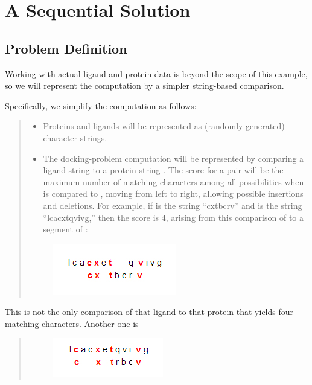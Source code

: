 \documentclass[letterpaper,10pt,openany,oneside]{sphinxmanual}
\begin{document}
\chapter{A Sequential Solution}
\label{sequentialimplementation/sequentialimplementation:a-sequential-solution}\label{sequentialimplementation/sequentialimplementation::doc}\label{sequentialimplementation/sequentialimplementation:folding-home}

\section{Problem Definition}
\label{sequentialimplementation/sequentialimplementation:problem-definition}
Working with actual ligand and protein data is beyond the scope of this example, so we will represent the computation by a simpler string-based comparison.

Specifically, we simplify the computation as follows:
\begin{quote}
\begin{itemize}
\item {} 
Proteins and ligands will be represented as (randomly-generated) character strings.

\item {} 
The docking-problem computation will be represented by comparing a ligand string  to a protein string .  The score for a pair \code{{[}L, P{]}} will be the maximum number of matching characters among all possibilities when  is compared to , moving from left to right, allowing possible insertions and deletions.  For example, if  is the string “cxtbcrv” and  is the string “lcacxtqvivg,” then the score is 4, arising from this comparison of  to a segment of :

\end{itemize}
\begin{figure}[htbp]
\centering

\includegraphics{seq1.jpg}
\end{figure}
\end{quote}

This is not the only comparison of that ligand to that protein that yields four matching characters. Another one is
\begin{quote}
\begin{figure}[htbp]
\centering

\includegraphics{seq2.jpg}
\end{figure}
\end{quote}
\end{document}
